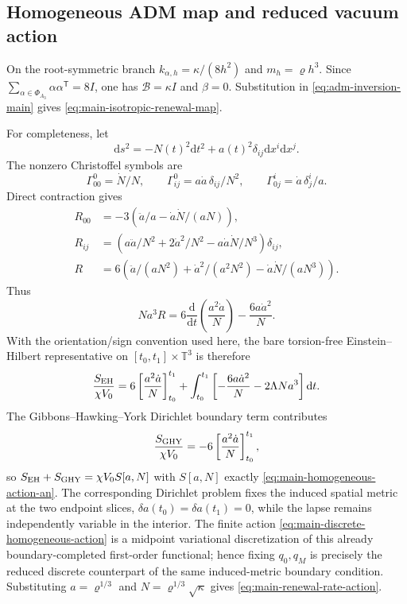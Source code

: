 \documentclass[11pt]{article}
\theoremstyle{definition}
\theoremstyle{remark}
\newcommand{\dd}{\mathrm d}
\begin{document}
\subsection{Homogeneous ADM map and reduced vacuum action}

On the root-symmetric branch
$k_{\alpha,h}=\kappa/(8h^2)$ and $m_h=\varrho h^3$.  Since
$\sum_{\alpha\in\Phi_{A_3}}\alpha\alpha^{\mathsf T}=8I$, one has
$\mathcal B=\kappa I$ and $\beta=0$.  Substitution in
\eqref{eq:adm-inversion-main} gives
\eqref{eq:main-isotropic-renewal-map}.

For completeness, let
\[
 \dd s^2=-N(t)^2\dd t^2+a(t)^2\delta_{ij}\dd x^i\dd x^j.
\]
The nonzero Christoffel symbols are
\[
 \Gamma^0_{00}=\dot N/N,\qquad
 \Gamma^0_{ij}=a\dot a\,\delta_{ij}/N^2,\qquad
 \Gamma^i_{0j}=\dot a\,\delta^i_j/a.
\]
Direct contraction gives
\begin{align}
 R_{00}&=-3\left(\ddot a/a-\dot a\dot N/(aN)\right),\\
 R_{ij}&=\left(a\ddot a/N^2+2\dot a^2/N^2
              -a\dot a\dot N/N^3\right)\delta_{ij},\\
 R&=6\left(\ddot a/(aN^2)+\dot a^2/(a^2N^2)
              -\dot a\dot N/(aN^3)\right).
 \label{eq:supp-homogeneous-curvature}
\end{align}
Thus
\begin{equation}
 Na^3R=6\frac{\dd}{\dd t}\left(\frac{a^2\dot a}{N}\right)
       -\frac{6a\dot a^2}{N}.
 \label{eq:supp-homogeneous-total-derivative}
\end{equation}
With the orientation/sign convention used here, the bare torsion-free
Einstein--Hilbert representative on $[t_0,t_1]\times\mathbb T^3$ is therefore
\begin{equation}
 \frac{S_{\rm EH}}{\chi V_0}
 =6\left[\frac{a^2\dot a}{N}\right]_{t_0}^{t_1}
 +\int_{t_0}^{t_1}\left[-\frac{6a\dot a^2}{N}
                         -2\Lambda Na^3\right]\dd t.
 \label{eq:supp-homogeneous-eh-split}
\end{equation}
The Gibbons--Hawking--York Dirichlet boundary term
\cite{York1972,GibbonsHawking1977} contributes
\begin{equation}
 \frac{S_{\rm GHY}}{\chi V_0}
 =-6\left[\frac{a^2\dot a}{N}\right]_{t_0}^{t_1},
 \label{eq:supp-homogeneous-ghy}
\end{equation}
so $S_{\rm EH}+S_{\rm GHY}=\chi V_0S[a,N]$ with $S[a,N]$ exactly
\eqref{eq:main-homogeneous-action-an}.  The corresponding Dirichlet problem
fixes the induced spatial metric at the two endpoint slices,
$\delta a(t_0)=\delta a(t_1)=0$, while the lapse remains independently variable
in the interior.  The finite action \eqref{eq:main-discrete-homogeneous-action}
is a midpoint variational discretization of this already boundary-completed
first-order functional; hence fixing $q_0,q_M$ is precisely the reduced discrete
counterpart of the same induced-metric boundary condition.  Substituting
$a=\varrho^{1/3}$ and $N=\varrho^{1/3}\sqrt\kappa$ gives
\eqref{eq:main-renewal-rate-action}.
\end{document}
